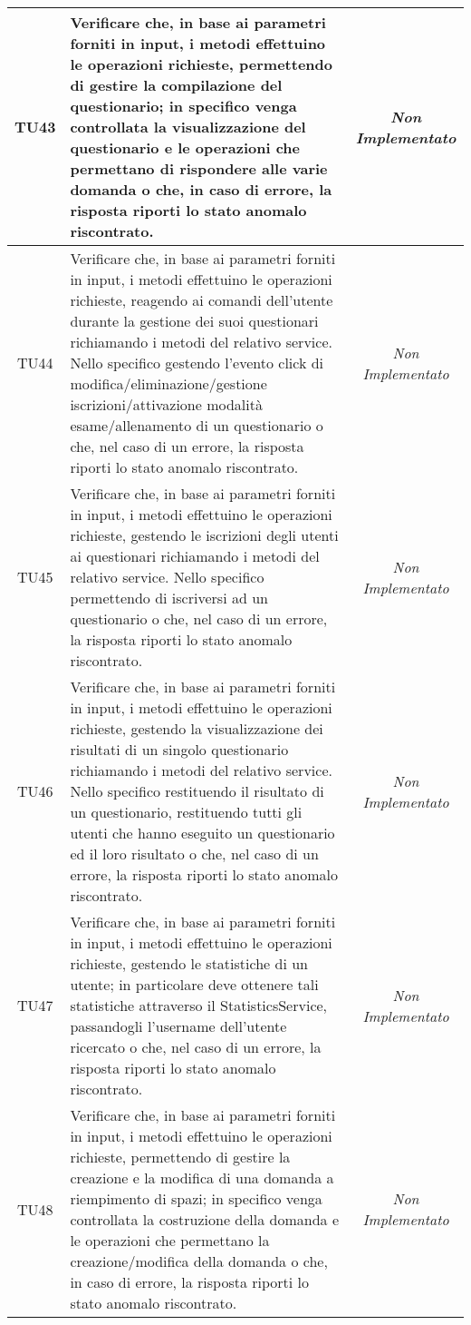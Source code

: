 \begin{longtable}{|c|>{}m{10cm}|c|}
\hypertarget{TU43}{TU43} & Verificare che, in base ai parametri forniti in input, i metodi effettuino le operazioni richieste, permettendo di gestire la compilazione del questionario; in specifico venga controllata la visualizzazione del questionario e le operazioni che permettano di rispondere alle varie domanda o che, in caso di errore, la risposta riporti lo stato anomalo riscontrato. & \textit{Non Implementato}\\ \hline
\hypertarget{TU44}{TU44} & Verificare che, in base ai parametri forniti in input, i metodi effettuino le operazioni richieste, reagendo ai comandi dell'utente durante la gestione dei suoi questionari richiamando i metodi del relativo service. Nello specifico gestendo l'evento click di modifica/eliminazione/gestione iscrizioni/attivazione modalità esame/allenamento di un questionario o che, nel caso di un errore, la risposta riporti lo stato anomalo riscontrato. & \textit{Non Implementato}\\ \hline
\hypertarget{TU45}{TU45} & Verificare che, in base ai parametri forniti in input, i metodi effettuino le operazioni richieste, gestendo le iscrizioni degli utenti ai questionari richiamando i metodi del relativo service. Nello specifico permettendo di iscriversi ad un questionario o che, nel caso di un errore, la risposta riporti lo stato anomalo riscontrato. & \textit{Non Implementato}\\ \hline
\hypertarget{TU46}{TU46} & Verificare che, in base ai parametri forniti in input, i metodi effettuino le operazioni richieste, gestendo la visualizzazione dei risultati di un singolo questionario richiamando i metodi del relativo service. Nello specifico restituendo il risultato di un questionario, restituendo tutti gli utenti che hanno eseguito un questionario ed il loro risultato o che, nel caso di un errore, la risposta riporti lo stato anomalo riscontrato. & \textit{Non Implementato}\\ \hline
\hypertarget{TU47}{TU47} & Verificare che, in base ai parametri forniti in input, i metodi effettuino le operazioni richieste, gestendo le statistiche di un utente; in particolare deve ottenere tali statistiche attraverso il StatisticsService, passandogli l'username dell'utente ricercato o che, nel caso di un errore, la risposta riporti lo stato anomalo riscontrato. & \textit{Non Implementato}\\ \hline
\hypertarget{TU48}{TU48} & Verificare che, in base ai parametri forniti in input, i metodi effettuino le operazioni richieste, permettendo di gestire la creazione e la modifica di una domanda a riempimento di spazi; in specifico venga controllata la costruzione della domanda e le operazioni che permettano la creazione/modifica della domanda o che, in caso di errore, la risposta riporti lo stato anomalo riscontrato. & \textit{Non Implementato}\\ \hline

\end{longtable}
